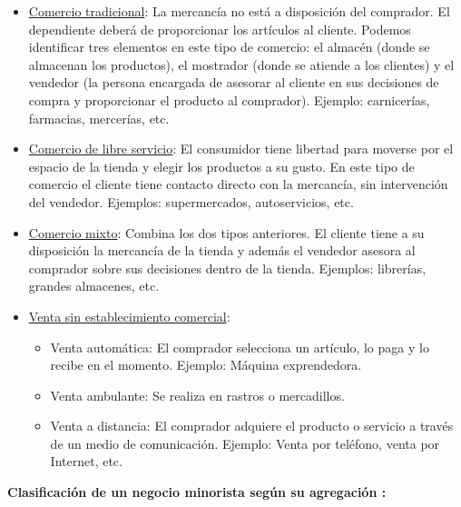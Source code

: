 \begin{itemize}
	
	\item \underline{Comercio tradicional}:  La mercancía no está a disposición del comprador. El dependiente deberá de proporcionar los artículos al cliente. Podemos identificar tres elementos en este tipo de comercio: el almacén (donde se almacenan los productos), el mostrador (donde se atiende a los clientes) y el vendedor (la persona encargada de asesorar al cliente en sus decisiones de compra y proporcionar el producto al comprador). Ejemplo: carnicerías, farmacias, mercerías, etc. 
	\item \underline{Comercio de libre servicio}: El consumidor tiene libertad para moverse por el espacio de la tienda y elegir los productos a su gusto. En este tipo de comercio el cliente tiene contacto directo con la mercancía, sin intervención del vendedor.  Ejemplos: supermercados, autoservicios, etc. 
	\item \underline{Comercio mixto}: Combina los dos tipos anteriores. El cliente tiene a su disposición la mercancía de la tienda y además el vendedor asesora al comprador sobre sus decisiones dentro de la tienda. Ejemplos: librerías, grandes almacenes, etc. 
	\item \underline{Venta sin establecimiento comercial}: 
	\begin{itemize}
		\item Venta automática: El comprador selecciona un artículo, lo paga y lo recibe en el momento. Ejemplo: Máquina exprendedora. 
		\item Venta ambulante: Se realiza en rastros o mercadillos.
		\item Venta a distancia: El comprador adquiere el producto o servicio a través de un medio de comunicación. Ejemplo: Venta por teléfono, venta por Internet, etc. 
	\end{itemize}
\end{itemize}

\textbf{Clasificación de un negocio minorista según su agregación \cite{wikiMinorista}:}

